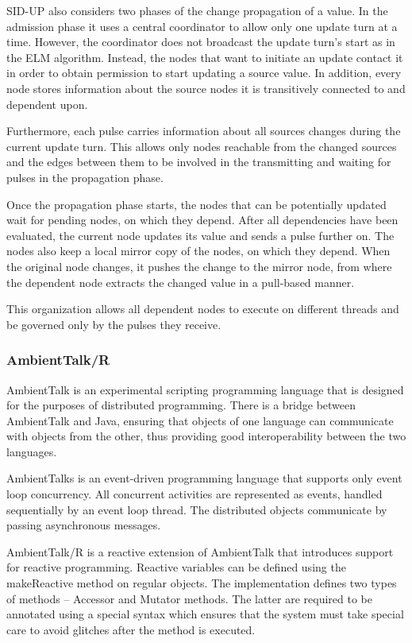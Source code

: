\documentclass{sigplanconf}
\begin{document}
SID-UP also considers two phases of the change propagation of a value. In the admission phase it uses a central coordinator to allow only one update turn at a time. However, the coordinator does not broadcast the update turn's start as in the ELM algorithm. Instead, the nodes that want to initiate an update contact it in order to obtain permission to start updating a source value. In addition, every node stores information about the source nodes it is transitively connected to and dependent upon.

Furthermore, each pulse carries information about all sources changes during the current update turn. This allows only nodes reachable from the changed sources and the edges between them to be involved in the transmitting and waiting for pulses in the propagation phase.

Once the propagation phase starts, the nodes that can be potentially updated wait for pending nodes, on which they depend. After all dependencies have been evaluated, the current node updates its value and sends a pulse further on. The nodes also keep a local mirror copy of the nodes, on which they depend. When the original node changes, it pushes the change to the mirror node, from where the dependent node extracts the changed value in a pull-based manner.

This organization allows all dependent nodes to execute on different threads and be governed only by the pulses they receive.

\subsubsection{AmbientTalk/R}
AmbientTalk \cite{loosely} is an experimental scripting programming language that is designed for the purposes of distributed programming. There is a bridge between AmbientTalk and Java, ensuring that objects of one language can communicate with objects from the other, thus providing good interoperability between the two languages.

AmbientTalks is an event-driven programming language that supports only event loop concurrency. All concurrent activities are represented as events, handled sequentially by an event loop thread. The distributed objects communicate by passing asynchronous messages.

AmbientTalk/R is a reactive extension of AmbientTalk that introduces support for reactive programming. Reactive variables can be defined using the makeReactive method on regular objects. The implementation defines two types of methods – Accessor and Mutator methods. The latter are required to be annotated using a special syntax which ensures that the system must take special care to avoid glitches after the method is executed.
\end{document}
